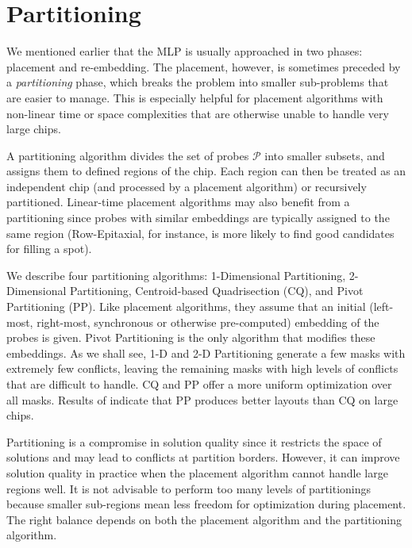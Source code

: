 \chapter{Partitioning}
\label{ch:part}

We mentioned earlier that the MLP is usually approached in two phases:
placement and re-embedding. The placement, however, is sometimes
preceded by a \emph{partitioning} phase, which breaks the problem into
smaller sub-problems that are easier to manage. This is especially
helpful for placement algorithms with non-linear time or space
complexities that are otherwise unable to handle very large chips.

A partitioning algorithm divides the set of probes $\mathcal{P}$ into smaller
subsets, and assigns them to defined regions of the chip. Each region can then
be treated as an independent chip (and processed by a placement algorithm) or
recursively partitioned. Linear-time placement algorithms may also benefit from
a partitioning since probes with similar embeddings are typically assigned to
the same region (Row-Epitaxial, for instance, is more likely to find good
candidates for filling a spot).

We describe four partitioning algorithms: 1-Dimensional Partitioning,
2-Dimen\-sional Partitioning, Centroid-based Quadrisection (CQ), and
Pivot Partitioning (PP). Like placement algorithms, they assume that
an initial (left-most, right-most, synchronous or otherwise
pre-computed) embedding of the probes is given. Pivot Partitioning is
the only algorithm that modifies these embeddings.  As we shall see,
1-D and 2-D Partitioning generate a few masks with extremely few
conflicts, leaving the remaining masks with high levels of conflicts
that are difficult to handle. CQ and PP offer a more uniform
optimization over all masks. Results of \citet{Carvalho2006} indicate
that PP produces better layouts than CQ on large chips.

Partitioning is a compromise in solution quality since it restricts
the space of solutions and may lead to conflicts at partition borders.
However, it can improve solution quality in practice when the
placement algorithm cannot handle large regions well. It is not
advisable to perform too many levels of partitionings because smaller
sub-regions mean less freedom for optimization during placement. The
right balance depends on both the placement algorithm and the
partitioning algorithm.


